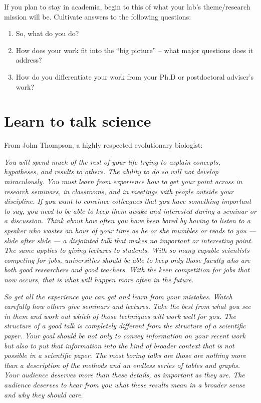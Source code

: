 \documentclass[12pt]{article}
\begin{document}
If you plan to stay in academia, begin to this of what your lab's
theme/research mission will be. Cultivate answers to the following
questions:

\begin{enumerate}
\item So, what do you do?
\item How does your work fit into the ``big picture'' -- what major
  questions does it address?
\item How do you differentiate your work from your Ph.D or
  postdoctoral adviser's work?
\end{enumerate}


\section{Learn to talk science}
\label{sec:talkScience}

From John Thompson, a highly respected evolutionary biologist:

\textit{You will spend much of the rest of your life trying to explain
  concepts, hypotheses, and results to others. The ability to do so
  will not develop miraculously. You must learn from experience how to
  get your point across in research seminars, in classrooms, and in
  meetings with people outside your discipline. If you want to
  convince colleagues that you have something important to say, you
  need to be able to keep them awake and interested during a seminar
  or a discussion. Think about how often you have been bored by having
  to listen to a speaker who wastes an hour of your time as he or she
  mumbles or reads to you --- slide after slide --- a disjointed talk that
  makes no important or interesting point. The same applies to giving
  lectures to students. With so many capable scientists competing for
  jobs, universities should be able to keep only those faculty who are
  both good researchers and good teachers. With the keen competition
  for jobs that now occurs, that is what will happen more often in the
  future.}

\textit{So get all the experience you can get and learn from your
  mistakes. Watch carefully how others give seminars and
  lectures. Take the best from what you see in them and work out which
  of those techniques will work well for you. The structure of a good
  talk is completely different from the structure of a scientific
  paper. Your goal should be not only to convey information on your
  recent work but also to put that information into the kind of
  broader context that is not possible in a scientific paper. The most
  boring talks are those are nothing more than a description of the
  methods and an endless series of tables and graphs. Your audience
  deserves more than these details, as important as they are. The
  audience deserves to hear from you what these results mean in a
  broader sense and why they should care.}
\end{document}

